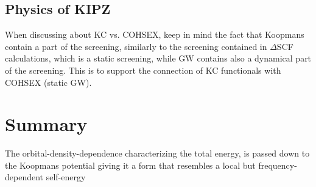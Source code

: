 \subsection{Physics of KIPZ\label{sec:kipz-cohsex}}
When discussing about KC vs. COHSEX, keep in mind the fact that Koopmans contain a part of the screening, similarly to the screening contained in $\Delta$SCF calculations, which is a static screening, while GW contains also a dynamical part of the screening. This is to support the connection of KC functionals with COHSEX (static GW).

\clearpage
\section{Summary\label{sec:ch3-summary}}
The orbital-density-dependence characterizing the total energy, is passed down to the Koopmans potential giving it a form that resembles a local but frequency-dependent self-energy